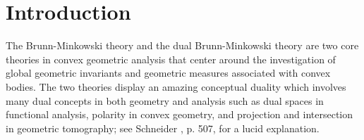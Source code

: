 \documentclass{cpamart1}     %
\theoremstyle{definition}
\theoremstyle{remark}
\begin{document}
\maketitle   








\section{Introduction}



The Brunn-Minkowski theory and the dual Brunn-Minkowski theory
are two core theories in convex geometric analysis that center around the investigation
 of global geometric invariants and geometric measures associated with convex bodies.
  The two theories display an amazing conceptual duality
which involves many dual concepts in both geometry and analysis such as dual
spaces in functional analysis, polarity in convex geometry, and projection
and intersection in geometric tomography; see Schneider \cite{S14}, p. 507, for
a lucid explanation.
\end{document}
